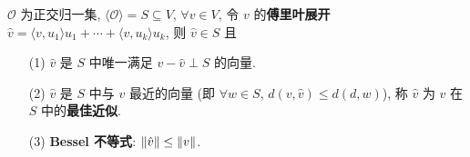 \documentclass{note}
\begin{document}
\begin{thm}[(课本定理 9.11)]
    $\mathcal{O}$ 为正交归一集, $\langle\mathcal{O}\rangle=S\subseteq V$, $\forall v\in V$, 令 $v$ 的\textbf{傅里叶展开} $\hat{v}=\langle v,u_1\rangle u_1+\cdots+\langle v,u_k\rangle u_k$, 则 $\hat{v}\in S$ 且
    \begin{itemize}
        \item[(1)] $\hat{v}$ 是 $S$ 中唯一满足 $v-\hat{v}\perp S$ 的向量.
        \item[(2)] $\hat{v}$ 是 $S$ 中与 $v$ 最近的向量 (即 $\forall w\in S$, $d(v,\hat{v})\leq d(d,w)$), 称 $\hat{v}$ 为 $v$ 在 $S$ 中的\textbf{最佳近似}.
        \item[(3)] \textbf{Bessel 不等式}: $\left\lVert\hat{v}\right\rVert\leq\left\lVert v\right\rVert$.
    \end{itemize}
\end{thm}
\end{document}
